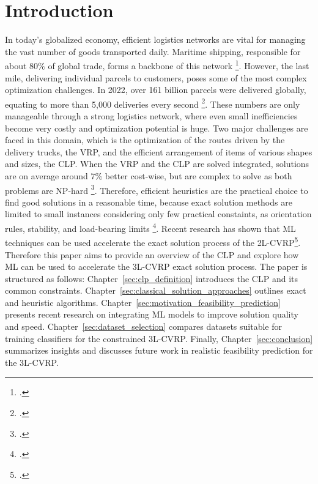 \chapter{Introduction}
\label{sec:introduction}
In today’s globalized economy, efficient logistics networks are vital for managing the vast number of
goods transported daily. Maritime shipping, responsible for about $80\%$ of global trade,
forms a backbone of this network \footcite[cf.][]{united_nations_trade_and_development_review_2024}.
However, the last mile, delivering individual parcels to customers, poses some of the most complex optimization
challenges. In 2022, over 161 billion parcels were delivered globally, equating to more than 5,000
deliveries every second \footcite[cf.][]{noauthor_parcel_nodate}.
These numbers are only manageable through a strong logistics network, where even small inefficiencies
become very costly and optimization potential is huge. Two major challenges are faced in this domain, which
is the optimization of the routes driven by the delivery trucks, the \gls{VRP}, and the efficient arrangement of items
of various shapes and sizes, the \gls{CLP}. When the \gls{VRP} and the \gls{CLP} are solved integrated,
solutions are on average around $7\%$ better cost-wise, but are complex to solve as
both problems are NP-hard \footcite[cf.][p.]{cote_value_2016}. Therefore, efficient heuristics are the practical
choice to find good solutions in a reasonable time, because exact solution methods are limited to
small instances considering only few practical constaints, as orientation rules, stability, and load-bearing limits \footcite[cf.][p.377--378]{bischoff_issues_1995}.
Recent research has shown that \gls{ML} techniques can be used accelerate the exact solution process of the \gls{2L-CVRP}\footcite[cf.][]{zhang_learning-based_2022}.
Therefore this paper aims to provide an overview
of the \gls{CLP} and explore how \gls{ML} can be used to accelerate the \gls{3L-CVRP} exact solution process.
The paper is structured as follows:
Chapter~\ref{sec:clp_definition} introduces the \gls{CLP} and its common constraints.
Chapter~\ref{sec:classical_solution_approaches} outlines exact and heuristic algorithms.
Chapter~\ref{sec:motivation_feasibility_prediction} presents recent research on integrating \gls{ML}
models to improve solution quality and speed. Chapter~\ref{sec:dataset_selection} compares datasets
suitable for training classifiers for the constrained \gls{3L-CVRP}. Finally, Chapter~\ref{sec:conclusion}
summarizes insights and discusses future work in realistic feasibility prediction for the \gls{3L-CVRP}.
